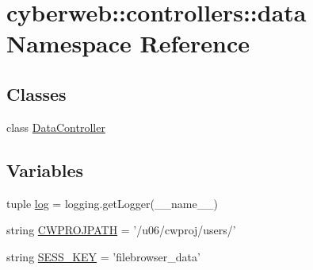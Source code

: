 \hypertarget{namespacecyberweb_1_1controllers_1_1data}{\section{cyberweb\-:\-:controllers\-:\-:data \-Namespace \-Reference}
\label{namespacecyberweb_1_1controllers_1_1data}
}
\subsection*{\-Classes}
\begin{DoxyCompactItemize}
\item 
class \hyperlink{classcyberweb_1_1controllers_1_1data_1_1_data_controller}{\-Data\-Controller}
\end{DoxyCompactItemize}
\subsection*{\-Variables}
\begin{DoxyCompactItemize}
\item 
tuple \hyperlink{namespacecyberweb_1_1controllers_1_1data_af605a1c450275d4d286e5adcea0bc341}{log} = logging.\-get\-Logger(\-\_\-\-\_\-name\-\_\-\-\_\-)
\item 
string \hyperlink{namespacecyberweb_1_1controllers_1_1data_af3070d06c83f5f8d6b5e67e0548efcd0}{\-C\-W\-P\-R\-O\-J\-P\-A\-T\-H} = '/u06/cwproj/users/'
\item 
string \hyperlink{namespacecyberweb_1_1controllers_1_1data_aa83a58bebb6549fbb7ab18c44eb5f91b}{\-S\-E\-S\-S\-\_\-\-K\-E\-Y} = 'filebrowser\-\_\-data'
\end{DoxyCompactItemize}


